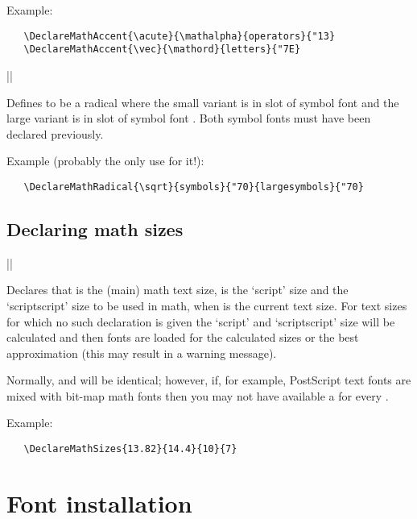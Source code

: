 \documentclass{ltxguide}[1995/11/28]
\begin{document}
Example:
\begin{verbatim}
   \DeclareMathAccent{\acute}{\mathalpha}{operators}{"13}
   \DeclareMathAccent{\vec}{\mathord}{letters}{"7E}
\end{verbatim}


\begin{decl}
  |\DeclareMathRadical| 
                         \\
            \null\hfill {} 
\end{decl}

Defines  to be a radical where the small variant is in slot
 of symbol font  and the large variant is in
slot  of symbol font .  Both symbol fonts must
have been declared previously.

Example (probably the only use for it!):
\begin{verbatim}
   \DeclareMathRadical{\sqrt}{symbols}{"70}{largesymbols}{"70}
\end{verbatim}

\subsection{Declaring math sizes}

\begin{decl}
  |\DeclareMathSizes|   
\end{decl}

Declares that  is the (main) math text size,  is
the `script' size and  the `scriptscript' size to be used in
math, when  is the current text size. For text sizes for which
no such declaration is given the `script' and `scriptscript' size will
be calculated and then fonts are loaded for the calculated sizes or the
best approximation (this may result in a warning message).

Normally,  and  will be identical; however, if, for
example, PostScript text fonts are mixed with bit-map math fonts then
you may not have available a  for every .

Example:
\begin{verbatim}
   \DeclareMathSizes{13.82}{14.4}{10}{7}
\end{verbatim}

\section{Font installation}
\label{sec:install}
\end{document}

